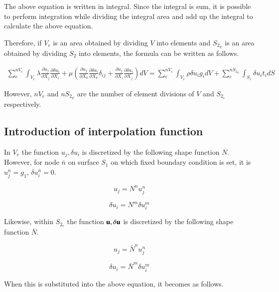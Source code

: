 The above equation is written in integral. Since the integral is sum, it is possible to perform integration while dividing the integral area and add up the integral to calculate the above equation.

Therefore, if $V_e$ is an area obtained by dividing $V$ into elements and ${S_2}_e$ is an area obtained by dividing $S_2$ into elements, the formula can be written as follows.

\begin{eqnarray}
\sum_e^{nV_e}\int_{V_e} \lambda\frac{\partial u_j}{\partial X_j}\frac{\partial \delta u_i}{\partial X_i} + \mu\left(\frac{\partial u_j}{\partial X_k}\frac{\partial \delta u_i}{\partial X_k}\delta_{ij} + \frac{\partial u_j}{\partial X_i}\frac{\partial \delta u_i}{\partial X_j} \right)dV
= \sum_e^{nV_e}\int_{V_e}\rho\delta u_i g_idV + \sum_e^{n{S_2}_e}\int_{S_e}\delta u_i t_idS
\end{eqnarray}


However, $nV_e$ and $n{S_2}_e$ are the number of element divisions of $V$ and $S_{2_e}$ respectively.

\subsection{Introduction of interpolation function}


In $V_e$ the function $u_j,\delta u_i$ is discretized by the following shape function $N$. ~
However, for node $\bar{n}$ on surface $S_1$ on which fixed boundary condition is set, it is $u_j^{\bar{n}}=g_1$, $\delta u_i^{\bar{n}}=0$.

\begin{equation}
u_j = N^n u_j^n
\end{equation}

\begin{equation}
\delta u_i = N^m\delta u_i^m
\end{equation}


Likewise, within $S_{2_e}$ the function $\mathbf{u},\delta\mathbf{u}$ is discretized by the following shape function $\bar{N}$.

\begin{equation}
u_j = \bar{N}^n u_j^n
\end{equation}

\begin{equation}
\delta u_i = \bar{N}^m\delta u_i^m
\end{equation}


When this is substituted into the above equation, it becomes as follows.

